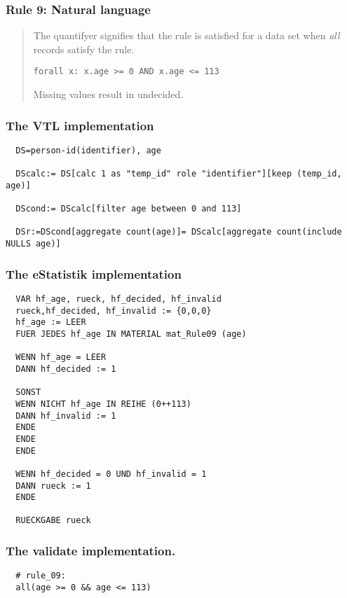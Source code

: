 \newpage

\subsubsection*{  Rule 9: Natural language}
\begin{quote}


The  quantifyer signifies that the rule is satisfied for a data set when \emph{all} records satisfy the rule.

\begin{verbatim}
forall x: x.age >= 0 AND x.age <= 113
\end{verbatim}

Missing values result in undecided.


\end{quote}
\subsubsection*{The VTL implementation}
\begin{verbatim}
  DS=person-id(identifier), age

  DScalc:= DS[calc 1 as "temp_id" role "identifier"][keep (temp_id, age)]

  DScond:= DScalc[filter age between 0 and 113]

  DSr:=DScond[aggregate count(age)]= DScalc[aggregate count(include NULLS age)]

\end{verbatim}
\subsubsection*{The eStatistik implementation}
\begin{verbatim}
  VAR hf_age, rueck, hf_decided, hf_invalid
  rueck,hf_decided, hf_invalid := {0,0,0}
  hf_age := LEER
  FUER JEDES hf_age IN MATERIAL mat_Rule09 (age)

  WENN hf_age = LEER
  DANN hf_decided := 1

  SONST
  WENN NICHT hf_age IN REIHE (0++113)
  DANN hf_invalid := 1
  ENDE
  ENDE
  ENDE

  WENN hf_decided = 0 UND hf_invalid = 1
  DANN rueck := 1
  ENDE

  RUECKGABE rueck
\end{verbatim}
\subsubsection*{The validate implementation.}
\begin{verbatim}
  # rule_09:
  all(age >= 0 && age <= 113)
\end{verbatim}



